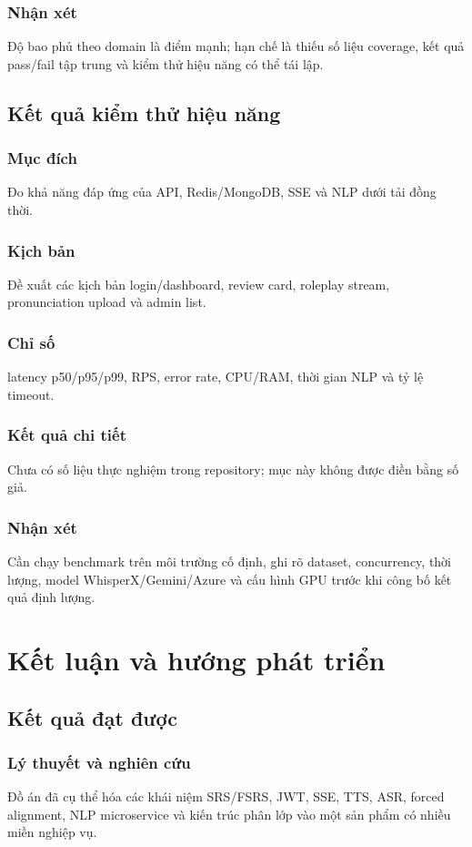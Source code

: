 \documentclass[12pt,a4paper]{report}
\begin{document}
\subsection{Nhận xét}
Độ bao phủ theo domain là điểm mạnh; hạn chế là thiếu số liệu coverage, kết quả pass/fail tập trung và kiểm thử hiệu năng có thể tái lập.
\section{Kết quả kiểm thử hiệu năng}
\subsection{Mục đích} Đo khả năng đáp ứng của API, Redis/MongoDB, SSE và NLP dưới tải đồng thời.\newline
\subsection{Kịch bản} Đề xuất các kịch bản login/dashboard, review card, roleplay stream, pronunciation upload và admin list.\newline
\subsection{Chỉ số} latency p50/p95/p99, RPS, error rate, CPU/RAM, thời gian NLP và tỷ lệ timeout.\newline
\subsection{Kết quả chi tiết} Chưa có số liệu thực nghiệm trong repository; mục này không được điền bằng số giả.\newline
\subsection{Nhận xét} Cần chạy benchmark trên môi trường cố định, ghi rõ dataset, concurrency, thời lượng, model WhisperX/Gemini/Azure và cấu hình GPU trước khi công bố kết quả định lượng.

\chapter{Kết luận và hướng phát triển}
\section{Kết quả đạt được}
\subsection{Lý thuyết và nghiên cứu}
Đồ án đã cụ thể hóa các khái niệm SRS/FSRS, JWT, SSE, TTS, ASR, forced alignment, NLP microservice và kiến trúc phân lớp vào một sản phẩm có nhiều miền nghiệp vụ.
\end{document}
